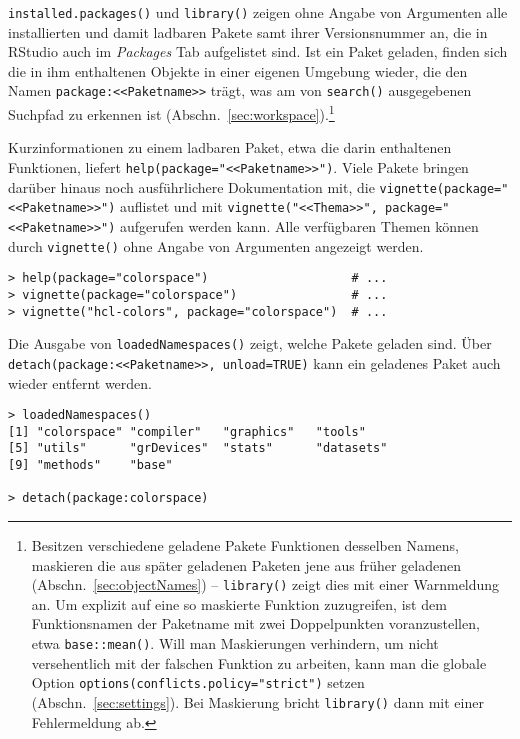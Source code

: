 \lstinline!installed.packages()! und \lstinline!library()! zeigen ohne Angabe von Argumenten alle installierten und damit ladbaren Pakete samt ihrer Versionsnummer an, die in RStudio auch im \emph{Packages} Tab aufgelistet sind. Ist ein Paket geladen, finden sich die in ihm enthaltenen Objekte in einer eigenen Umgebung wieder, die den Namen \lstinline!package:<<Paketname>>! trägt, was am von \lstinline!search()! ausgegebenen Suchpfad zu erkennen ist (Abschn.\ \ref{sec:workspace}).\footnote{\label{ftn:envirFunc}Besitzen verschiedene geladene Pakete Funktionen desselben Namens, maskieren die aus später geladenen Paketen jene aus früher geladenen (Abschn.\ \ref{sec:objectNames}) -- \lstinline!library()! zeigt dies mit einer Warnmeldung an. Um explizit auf eine so maskierte Funktion zuzugreifen, ist dem Funktionsnamen der Paketname mit zwei Doppelpunkten voranzustellen, etwa \lstinline!base::mean()!. Will man Maskierungen verhindern, um nicht versehentlich mit der falschen Funktion zu arbeiten, kann man die globale Option \lstinline!options(conflicts.policy="strict")! setzen (Abschn.\ \ref{sec:settings}). Bei Maskierung bricht \lstinline!library()! dann mit einer Fehlermeldung ab.}

Kurzinformationen zu einem ladbaren Paket, etwa die darin enthaltenen Funktionen, liefert \lstinline!help(package="<<Paketname>>")!. Viele Pakete bringen darüber hinaus noch ausführlichere Dokumentation mit, die \lstinline!vignette(package="<<Paketname>>")! auflistet und mit \lstinline!vignette("<<Thema>>", package="<<Paketname>>")! aufgerufen werden kann. Alle verfügbaren Themen können durch \lstinline!vignette()! ohne Angabe von Argumenten angezeigt werden.
\begin{lstlisting}
> help(package="colorspace")                    # ...
> vignette(package="colorspace")                # ...
> vignette("hcl-colors", package="colorspace")  # ...
\end{lstlisting}
  
Die Ausgabe von \lstinline!loadedNamespaces()! zeigt, welche Pakete geladen sind. Über \lstinline!detach(package:<<Paketname>>, unload=TRUE)! kann ein geladenes Paket auch wieder entfernt werden.
\begin{lstlisting}
> loadedNamespaces()
[1] "colorspace" "compiler"   "graphics"   "tools"     
[5] "utils"      "grDevices"  "stats"      "datasets"  
[9] "methods"    "base"

> detach(package:colorspace)
\end{lstlisting}

